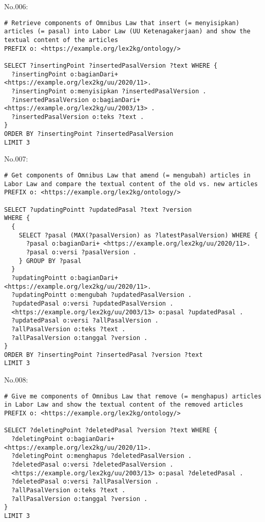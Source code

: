 \noindent No.006:
\begin{lstlisting}
# Retrieve components of Omnibus Law that insert (= menyisipkan) articles (= pasal) into Labor Law (UU Ketenagakerjaan) and show the textual content of the articles
PREFIX o: <https://example.org/lex2kg/ontology/>

SELECT ?insertingPoint ?insertedPasalVersion ?text WHERE {
  ?insertingPoint o:bagianDari+ <https://example.org/lex2kg/uu/2020/11>.
  ?insertingPoint o:menyisipkan ?insertedPasalVersion .
  ?insertedPasalVersion o:bagianDari+ <https://example.org/lex2kg/uu/2003/13> .
  ?insertedPasalVersion o:teks ?text .
}
ORDER BY ?insertingPoint ?insertedPasalVersion
LIMIT 3

\end{lstlisting}


\noindent No.007:
\begin{lstlisting}
# Get components of Omnibus Law that amend (= mengubah) articles in Labor Law and compare the textual content of the old vs. new articles
PREFIX o: <https://example.org/lex2kg/ontology/>

SELECT ?updatingPointt ?updatedPasal ?text ?version
WHERE {
  {
    SELECT ?pasal (MAX(?pasalVersion) as ?latestPasalVersion) WHERE {
      ?pasal o:bagianDari+ <https://example.org/lex2kg/uu/2020/11>.
      ?pasal o:versi ?pasalVersion .
    } GROUP BY ?pasal
  }
  ?updatingPointt o:bagianDari+ <https://example.org/lex2kg/uu/2020/11>.
  ?updatingPointt o:mengubah ?updatedPasalVersion .
  ?updatedPasal o:versi ?updatedPasalVersion .
  <https://example.org/lex2kg/uu/2003/13> o:pasal ?updatedPasal .
  ?updatedPasal o:versi ?allPasalVersion .
  ?allPasalVersion o:teks ?text .
  ?allPasalVersion o:tanggal ?version .
}
ORDER BY ?insertingPoint ?insertedPasal ?version ?text
LIMIT 3

\end{lstlisting}


\noindent No.008:
\begin{lstlisting}
# Give me components of Omnibus Law that remove (= menghapus) articles in Labor Law and show the textual content of the removed articles
PREFIX o: <https://example.org/lex2kg/ontology/>

SELECT ?deletingPoint ?deletedPasal ?version ?text WHERE {
  ?deletingPoint o:bagianDari+ <https://example.org/lex2kg/uu/2020/11>.
  ?deletingPoint o:menghapus ?deletedPasalVersion .
  ?deletedPasal o:versi ?deletedPasalVersion .
  <https://example.org/lex2kg/uu/2003/13> o:pasal ?deletedPasal .
  ?deletedPasal o:versi ?allPasalVersion .
  ?allPasalVersion o:teks ?text .
  ?allPasalVersion o:tanggal ?version .
}
LIMIT 3

\end{lstlisting}


